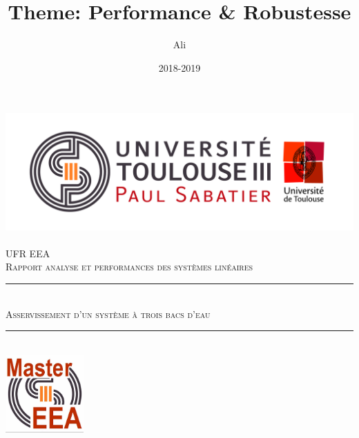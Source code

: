 \documentclass[12pt, a4paper, openany]{report}
\title{Theme: Performance & Robustesse}
\author{Ali \bsc{Kherbiche}}
\date{2018-2019}
\newcommand{\HRule}{\rule{\linewidth}{0.5mm}}
\begin{document}
\makeatletter
  \begin{titlepage}
  

  \begin{sffamily}
   \begin{center}

    \includegraphics[scale=0.5]{Logo_UT3.jpg}~\\[1.5cm]

    \textsc{\LARGE UFR EEA }\\[2cm]
    
    
    \textsc{\Large Rapport analyse et performances des systèmes linéaires}\\[1cm]

    \HRule \\[0.4cm]
    \textsc{ \huge Asservissement d'un système à trois bacs d'eau\\[0.4cm] }

    \HRule \\[2cm]
    \includegraphics[width=3cm,height=3cm,keepaspectratio] {cropped-Logo-master-EEA.jpg}
    \\[2cm]


\end{center}
\end{sffamily}
\end{titlepage}
\end{document}
